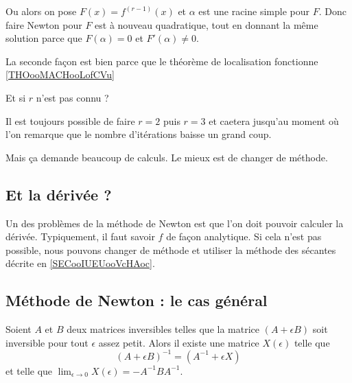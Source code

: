 Ou alors on pose \( F(x)=f^{(r-1)}(x)\) et \( \alpha\) est une racine simple pour \( F\). Donc faire Newton pour \( F\) est à nouveau quadratique, tout en donnant la même solution parce que \( F(\alpha)=0\) et \( F'(\alpha)\neq 0\).

La seconde façon est bien parce que le théorème de localisation fonctionne \ref{THOooMACHooLofCVu}

Et si \( r\) n'est pas connu ?

Il est toujours possible de faire \( r=2\) puis \( r=3\) et caetera jusqu'au moment où l'on remarque que le nombre d'itérations baisse un grand coup.

Mais ça demande beaucoup de calculs.  Le mieux est de changer de méthode.

\subsection{Et la dérivée ?}

Un des problèmes de la méthode de Newton est que l'on doit pouvoir calculer la dérivée. Typiquement, il faut savoir \( f\) de façon analytique. Si cela n'est pas possible, nous pouvons changer de méthode et utiliser la méthode des sécantes décrite en \ref{SECooIUEUooVcHAoc}.


\subsection{Méthode de Newton : le cas général}

\begin{lemma}       \label{LemXdObnV}
    Soient \( A\) et \( B\) deux matrices inversibles telles que la matrice \( (A+\epsilon B)\) soit inversible pour tout \( \epsilon\) assez petit. Alors il existe une matrice \( X(\epsilon)\) telle que
    \begin{equation}
        (A+\epsilon B)^{-1}=(A^{-1}+\epsilon X)
    \end{equation}
    et telle que \( \lim_{\epsilon\to 0}X(\epsilon)=-A^{-1} BA^{-1}\).
\end{lemma}

